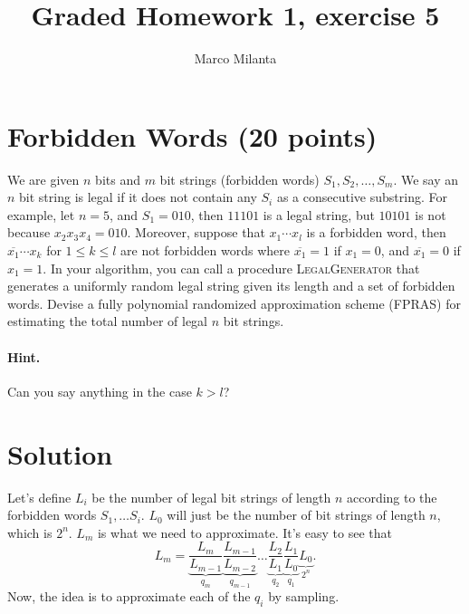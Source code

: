 \documentclass[11pt]{article}
\begin{document}
\author{Marco Milanta}
\title{Graded Homework 1, exercise 5}
\maketitle


\section*{Forbidden Words (20 points)}
We are given $n$ bits and $m$ bit strings (forbidden words) $S_1, S_2, \dots, S_m$. We say an $n$ bit string is legal if it does not contain any $S_i$ as a consecutive substring. For example, let $n=5$, and $S_1=010$, then $11101$ is a legal string, but $10101$ is not because $x_2x_3x_4 = 010$. Moreover, suppose that $x_1\cdots x_l$ is a forbidden word, then $\overline{x_1}\cdots x_k$ for $1\leq k\leq l$ are not forbidden words where $\overline{x_1}=1$ if $x_1=0$, and $\overline{x_1}=0$ if $x_1=1$. In your algorithm, you can call a procedure \textsc{LegalGenerator} that generates a uniformly random legal string given its length and a set of forbidden words. Devise a fully polynomial randomized approximation scheme (FPRAS) for estimating the total number of legal $n$ bit strings.



\paragraph{Hint.} Can you say anything in the case $k > l$?

\section*{Solution}
Let's define $L_i$ be the number of legal bit strings of length $n$ according to the forbidden words $S_1, \dots S_i$. $L_0$ will just be the number of bit strings of length $n$, which is $2^n$. $L_m$ is what we need to approximate. It's easy to see that
\begin{equation*}
    L_m = \underbrace{\frac{L_m}{L_{m-1}}}_{q_m}\underbrace{\frac{L_{m-1}}{L_{m-2}}}_{q_{m-1}}\dots\underbrace{\frac{L_{2}}{L_{1}}}_{q_2}\underbrace{\frac{L_1}{L_0}}_{q_1}\underbrace{L_0}_{2^n}.
\end{equation*}
Now, the idea is to approximate each of the $q_i$ by sampling.
\end{document}
